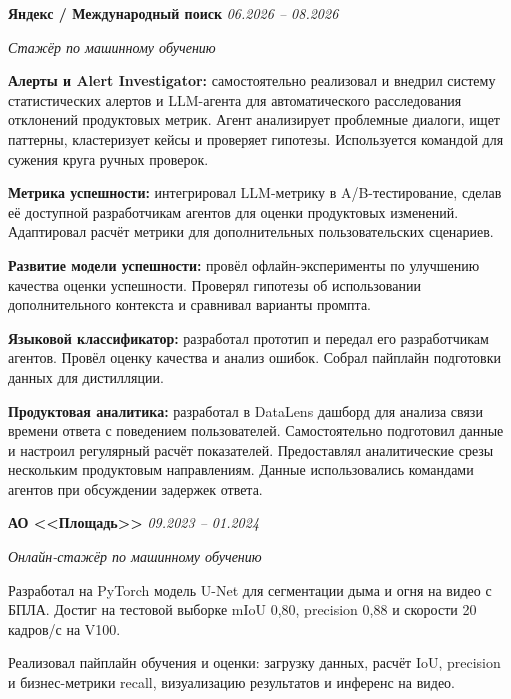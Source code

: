 
\textbf{Яндекс / Международный поиск} \hfill \emph{06.2026 -- 08.2026}

\textit{Стажёр по машинному обучению}
\begin{cvitems}
    \item \textbf{Алерты и Alert Investigator:} самостоятельно реализовал и внедрил систему статистических алертов и LLM-агента для автоматического расследования отклонений продуктовых метрик. Агент анализирует проблемные диалоги, ищет паттерны, кластеризует кейсы и проверяет гипотезы. Используется командой для сужения круга ручных проверок.
    \item \textbf{Метрика успешности:} интегрировал LLM-метрику в A/B-тестирование, сделав её доступной разработчикам агентов для оценки продуктовых изменений. Адаптировал расчёт метрики для дополнительных пользовательских сценариев.
    \item \textbf{Развитие модели успешности:} провёл офлайн-эксперименты по улучшению качества оценки успешности. Проверял гипотезы об использовании дополнительного контекста и сравнивал варианты промпта.
    \item \textbf{Языковой классификатор:} разработал прототип и передал его разработчикам агентов. Провёл оценку качества и анализ ошибок. Собрал пайплайн подготовки данных для дистилляции.
    \item \textbf{Продуктовая аналитика:} разработал в DataLens дашборд для анализа связи времени ответа с поведением пользователей. Самостоятельно подготовил данные и настроил регулярный расчёт показателей. Предоставлял аналитические срезы нескольким продуктовым направлениям. Данные использовались командами агентов при обсуждении задержек ответа.
\end{cvitems}

\textbf{АО <<Площадь>>} \hfill \emph{09.2023 -- 01.2024}

\textit{Онлайн-стажёр по машинному обучению}
\begin{cvitems}
    \item Разработал на PyTorch модель U-Net для сегментации дыма и огня на видео с БПЛА. Достиг на тестовой выборке mIoU 0{,}80, precision 0{,}88 и скорости 20 кадров/с на V100.
    \item Реализовал пайплайн обучения и оценки: загрузку данных, расчёт IoU, precision и бизнес-метрики recall, визуализацию результатов и инференс на видео.
\end{cvitems}
	
